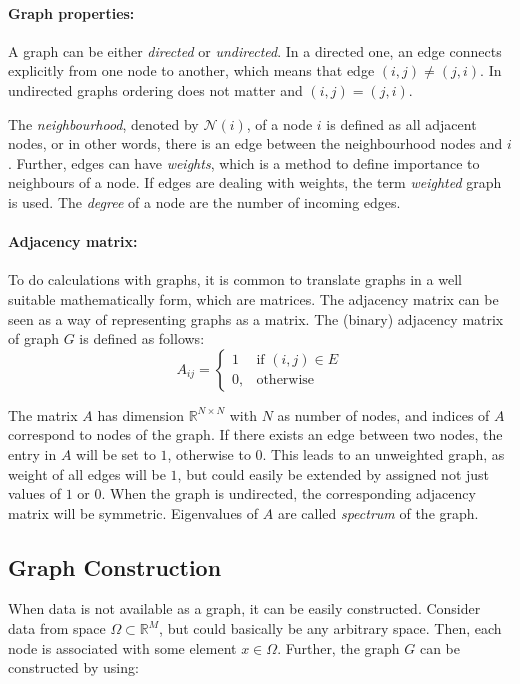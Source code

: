 \paragraph{Graph properties:}
A graph can be either \textit{directed} or \textit{undirected}. 
In a directed one, an edge connects explicitly from one node to another, which means that edge $(i, j) \neq (j, i)$. 
In undirected graphs ordering does not matter and $(i, j) = (j, i)$.

The \textit{neighbourhood}, denoted by $\mathcal{N}(i) $, of a node $i$  is defined as all adjacent nodes,
or in other words, there is an edge between the neighbourhood nodes and $i$. 
Further, edges can have \textit{weights}, which is a method to define importance to neighbours of a node.
If edges are dealing with weights, the term \textit{weighted} graph is used.
The \textit{degree} of a node are the number of incoming edges.

\paragraph{Adjacency matrix:}
To do calculations with graphs, it is common to translate graphs in a well suitable mathematically
form, which are matrices.
The adjacency matrix can be seen as a way of representing graphs as a matrix.
The (binary) adjacency matrix of graph $G$ is defined as follows:
\begin{equation}
    \label{eg:AdjacencyMatrix}
    A_{ij} =    
    \begin{cases}
        1  & \text{if } (i, j) \in E \\
        0, & \text{otherwise}
    \end{cases}
\end{equation}

The matrix $A$ has dimension $\mathbb{R}^{N \times N}$ with $N$ as number of nodes,
and indices of $A$ correspond to nodes of the graph.
If there exists an edge between two nodes, the entry in $A$ will be set to $1$, otherwise to $0$.
This leads to an unweighted graph, as weight of all edges will be $1$, 
but could easily be extended by assigned not just values of $1$ or $0$. 
When the graph is undirected, the corresponding adjacency matrix will be symmetric. 
Eigenvalues of $A$ are called \textit{spectrum} of the graph.


\subsection{Graph Construction}
\label{sec:graphConstruction}
When data is not available as a graph, it can be easily constructed.
Consider data from space $\Omega \subset \mathbb{R}^M $, but could basically be any arbitrary space.
Then, each node is associated with some element $x \in \Omega$.
Further, the graph $G$ can be constructed by using:

